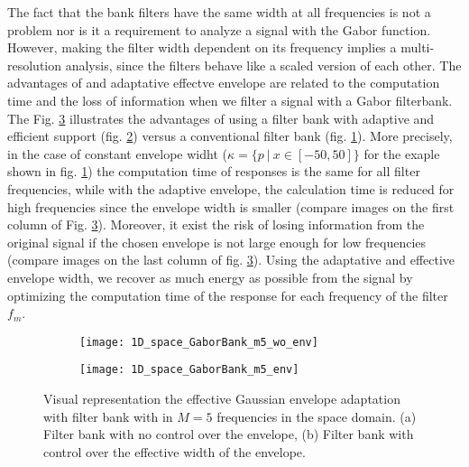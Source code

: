 The fact that the bank filters have the same width at all frequencies is not a problem nor is it a requirement to analyze a signal with the Gabor function. However, making the filter width dependent on its frequency implies a multi-resolution analysis, since the filters behave like a scaled version of each other. The advantages of and adaptative effectve envelope are related to the computation time and the loss of information when we filter a signal with a Gabor filterbank. The Fig. \ref{fig:1D_space_Gaborfilterbank} illustrates the advantages of using a filter bank with adaptive and efficient support (fig. \ref{fig:1D_space_Gaborfilterbank_env}) versus a conventional filter bank (fig. \ref{fig:1D_space_Gaborfilterbank_wo_env}). More precisely, in the case of constant envelope widht ($\kappa = \lbrace p ~|~ x \in [-50, 50] \rbrace$ for the exaple shown in fig. \ref{fig:1D_space_Gaborfilterbank_wo_env}) the computation time of responses is the same for all filter frequencies, while with the adaptive envelope, the calculation time is reduced for high frequencies since the envelope width is smaller (compare images on the first column of Fig. \ref{fig:1D_space_Gaborfilterbank}). Moreover, it exist the risk of losing information from the original signal if the chosen envelope is not large enough for low frequencies (compare images on the last column of fig. \ref{fig:1D_space_Gaborfilterbank}). Using the adaptative and effective envelope width, we recover as much energy as possible from the signal by optimizing the computation time of the response for each frequency of the filter $f_m$.

\begin{figure}[!ht] 
	\centering
	\begin{subfigure}[b]{\textwidth}
		\centering
		\texttt{[image: 1D\_space\_GaborBank\_m5\_wo\_env]}
		\caption{}
		\label{fig:1D_space_Gaborfilterbank_wo_env}
	\end{subfigure}
	\qquad %
	\begin{subfigure}[b]{\textwidth}
		\centering
		\texttt{[image: 1D\_space\_GaborBank\_m5\_env]}
		\caption{}
		\label{fig:1D_space_Gaborfilterbank_env}
	\end{subfigure}

  \caption{Visual representation the effective Gaussian envelope adaptation with filter bank with in  $ M = 5 $ frequencies in the space domain. (a) Filter bank with no control over the envelope, (b) Filter bank with control over the effective width of the envelope.}
  \label{fig:1D_space_Gaborfilterbank}
\end{figure}


